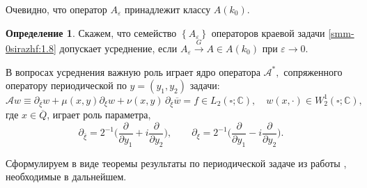 \documentclass[a4paper,12pt]{article}
\theoremstyle{definition}
\newtheorem{definition}{Определение}[section]
\begin{document}
Очевидно, что оператор $A_\varepsilon$ принадлежит классу $A(k_0)$.


\begin{definition}
Скажем, что семейство $\left\{ A_\varepsilon \right\}$ операторов
краевой задачи \eqref{smm-0sirazhf:1.8}  допускает усреднение, если $A_\varepsilon \overset{G}{\longrightarrow}A\in A(k_0) $ при
$\varepsilon\to 0$.
\end{definition}
В вопросах усреднения важную роль играет ядро оператора $\mathcal{A}^*,$ сопряженного оператору периодической по $y=(y_1,y_2)$ задачи:
\begin{equation}\label{smm-0sirazhf:1.7}
	\mathcal{A}w\equiv \partial_{\overline{\xi}}w +\mu(x,y) \partial_{\xi}w +\nu(x,y)\,
	\partial_{\overline \xi}\overline w=f\in L_2(\square;\mathbb{C}),\quad
	w(x,\cdot)\in W_2^1(\square;\mathbb{C}),
\end{equation}
где  $x\in \overline Q$, играет роль параметра,
$$
\partial_{\bar \xi}=2^{-1}\Big(\frac{\partial}{\partial y_1}+i\frac{\partial}{\partial y_2}\Big),\qquad  \partial_{\xi}=2^{-1}\Big(\frac{\partial}{\partial y_1}-i\frac{\partial}{\partial y_2}\Big).
$$

Сформулируем в виде теоремы результаты по периодической задаче из работы \cite{smm-15}, необходимые в дальнейшем.
\end{document}
